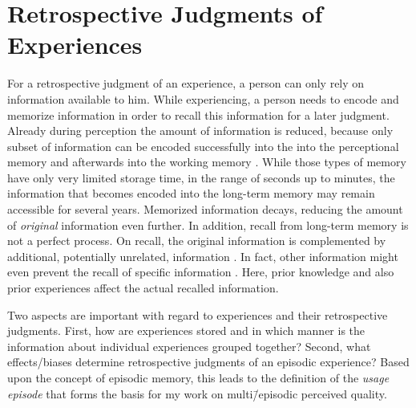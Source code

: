 \section{Retrospective Judgments of Experiences}\label{chap:03}
For a retrospective judgment of an experience, a person can only rely on information available to him.
While experiencing, a person needs to encode and memorize information in order to recall this information for a later judgment.
Already during perception the amount of information is reduced, because only subset of information can be encoded successfully into the into the perceptional memory and afterwards into the working memory \citep[][p.\,8f.]{raake_speech_2006}.
While those types of memory have only very limited storage time, in the range of seconds up to minutes, the information that becomes encoded into the long-term memory may remain accessible for several years.
Memorized information decays, reducing the amount of \emph{original} information even further.
In addition, recall from long-term memory is not a perfect process.
On recall, the original information is complemented by additional, potentially unrelated, information \citep[\cf,][]{schacter_seven_2003}.
In fact, other information might even prevent the recall of specific information \citep[\cf,][]{schacter_seven_2003}.
Here, prior knowledge and also prior experiences affect the actual recalled information.

Two aspects are important with regard to experiences and their retrospective judgments.
First, how are experiences stored and in which manner is the information about individual experiences grouped together?
Second, what effects/biases determine retrospective judgments of an episodic experience?
Based upon the concept of episodic memory, this leads to the definition of the \emph{usage episode} that forms the basis for my work on multi\=/episodic perceived quality.


